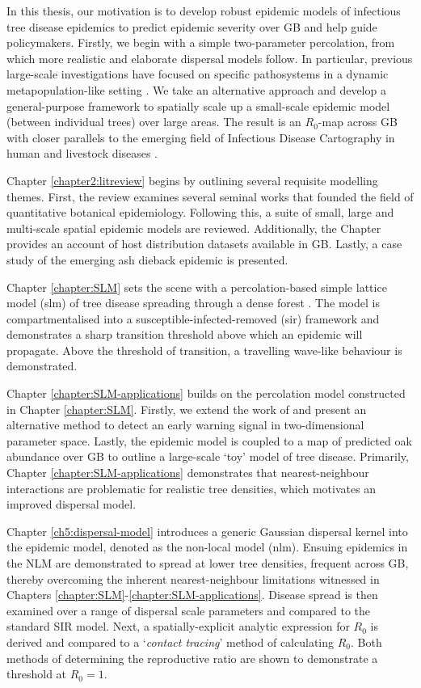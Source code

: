 In this thesis, our motivation is to develop robust epidemic models of infectious tree disease epidemics to predict epidemic severity over GB and help guide policymakers. Firstly, we begin with a simple two-parameter percolation, from which more realistic and elaborate dispersal models follow. 
In particular, previous large-scale investigations have focused on specific pathosystems in a dynamic metapopulation-like setting
\cite{large-scale-control, meentemeyer2011epidemiological, harwood2009epidemiological}. We take an alternative approach and develop a general-purpose framework to spatially scale up a small-scale epidemic model (between individual trees) over large areas. The result is an $R_0$-map across GB with closer parallels to the emerging field of Infectious Disease Cartography in human and livestock diseases \cite{otieno2021modeling, KRAEMER201619, messina2016mapping}.

Chapter \ref{chapter2:litreview} begins by outlining several requisite modelling themes. First, the review examines
several seminal works that founded the field of quantitative botanical epidemiology. Following this,
a suite of small, large and multi-scale spatial epidemic models are reviewed. Additionally,
the Chapter provides an account of host distribution datasets available in GB. Lastly, a case study of the emerging
ash dieback epidemic is presented.

Chapter \ref{chapter:SLM} sets the scene with a percolation-based simple lattice model (\acrshort{slm}) of tree
disease spreading through a dense forest \cite{OROZCOFUENTES201912}. The model is compartmentalised
into a susceptible-infected-removed (\acrshort{sir}) framework and demonstrates a sharp transition threshold above which an epidemic will propagate. 
Above the threshold of transition, a travelling wave-like behaviour is demonstrated.

Chapter \ref{chapter:SLM-applications} builds on the percolation model constructed in Chapter \ref{chapter:SLM}.
Firstly, we extend the work of \cite{OROZCOFUENTES201912} and present an alternative method to detect an early
warning signal in two-dimensional parameter space. Lastly, the epidemic model is coupled to a map of predicted
oak abundance over GB \cite{hill.data} to outline a large-scale `toy' model of tree disease. 
Primarily, Chapter \ref{chapter:SLM-applications} demonstrates that nearest-neighbour interactions are problematic
for realistic tree densities, which motivates an improved dispersal model. 

Chapter \ref{ch5:dispersal-model} introduces a generic Gaussian dispersal kernel into the epidemic model, denoted as the non-local model (\acrshort{nlm}). 
Ensuing epidemics in the NLM are demonstrated to spread at lower tree densities, frequent across GB, thereby overcoming the inherent nearest-neighbour limitations witnessed in Chapters \ref{chapter:SLM}-\ref{chapter:SLM-applications}.
Disease spread is then examined over a range of dispersal scale parameters and compared to the standard SIR model. Next, a spatially-explicit analytic expression for $R_0$ is derived and compared to a `\textit{contact tracing}' method of calculating $R_0$.
Both methods of determining the reproductive ratio are shown to demonstrate a threshold at $R_0=1$.

